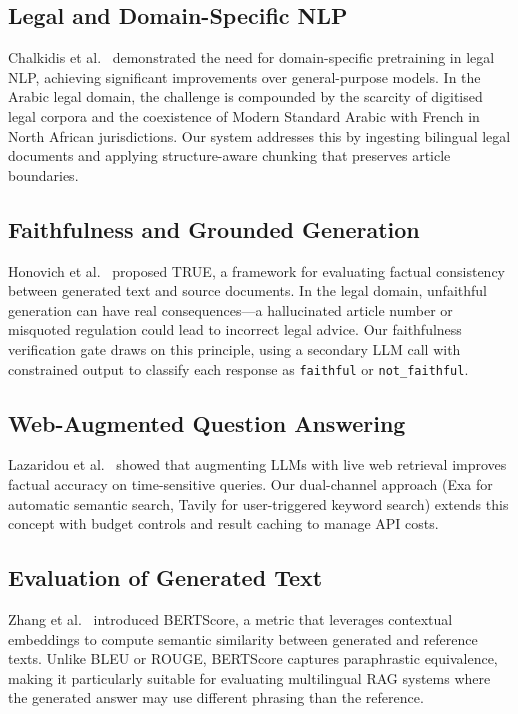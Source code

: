 \documentclass[12pt, a4paper]{article}
\begin{document}
\subsection{Legal and Domain-Specific NLP}
Chalkidis et al.~\cite{chalkidis2020legalbert} demonstrated the need for
domain-specific pretraining in legal NLP, achieving significant improvements
over general-purpose models. In the Arabic legal domain, the challenge is
compounded by the scarcity of digitised legal corpora and the coexistence
of Modern Standard Arabic with French in North African jurisdictions. Our
system addresses this by ingesting bilingual legal documents and applying
structure-aware chunking that preserves article boundaries.

\subsection{Faithfulness and Grounded Generation}
Honovich et al.~\cite{honovich2022true} proposed TRUE, a framework for
evaluating factual consistency between generated text and source documents.
In the legal domain, unfaithful generation can have real consequences---a
hallucinated article number or misquoted regulation could lead to incorrect
legal advice. Our faithfulness verification gate draws on this principle,
using a secondary LLM call with constrained output to classify each
response as \texttt{faithful} or \texttt{not\_faithful}.

\subsection{Web-Augmented Question Answering}
Lazaridou et al.~\cite{lazaridou2022internet} showed that augmenting LLMs
with live web retrieval improves factual accuracy on time-sensitive queries.
Our dual-channel approach (Exa for automatic semantic search, Tavily for
user-triggered keyword search) extends this concept with budget controls
and result caching to manage API costs.

\subsection{Evaluation of Generated Text}
Zhang et al.~\cite{zhang2020bertscore} introduced BERTScore, a metric that
leverages contextual embeddings to compute semantic similarity between
generated and reference texts. Unlike BLEU or ROUGE, BERTScore captures
paraphrastic equivalence, making it particularly suitable for evaluating
multilingual RAG systems where the generated answer may use different
phrasing than the reference.
\end{document}
